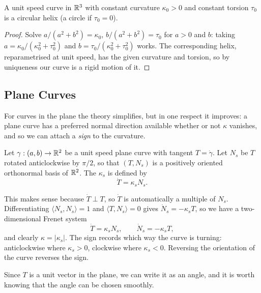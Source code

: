\documentclass[a4paper]{scrartcl}
\begin{document}
\begin{corollary}
    A unit speed curve in $\mathbb{R}^3$ with constant curvature $\kappa_0 > 0$ and constant torsion $\tau_0$ is a circular helix (a circle if $\tau_0 = 0$).
\end{corollary}
\begin{proof}
    Solve $a/(a^2+b^2) = \kappa_0$, $b/(a^2+b^2) = \tau_0$ for $a > 0$ and $b$: taking $a = \kappa_0/(\kappa_0^2+\tau_0^2)$ and $b = \tau_0/(\kappa_0^2+\tau_0^2)$ works. The corresponding helix, reparametrised at unit speed, has the given curvature and torsion, so by uniqueness our curve is a rigid motion of it.
\end{proof}

\subsection{Plane Curves}

For curves in the plane the theory simplifies, but in one respect it improves: a plane curve has a preferred normal direction available whether or not $\kappa$ vanishes, and so we can attach a \emph{sign} to the curvature.

\begin{definition}
    Let $\gamma: (a,b) \rightarrow \mathbb{R}^2$ be a unit speed plane curve with tangent $T = \dot\gamma$. Let $N_s$ be $T$ rotated anticlockwise by $\pi/2$, so that $(T, N_s)$ is a positively oriented orthonormal basis of $\mathbb{R}^2$. The  $\kappa_s$ is defined by
    $$
    \dot T = \kappa_s N_s.
    $$
\end{definition}

This makes sense because $\dot T \perp T$, so $\dot T$ is automatically a multiple of $N_s$. Differentiating $\langle N_s, N_s\rangle = 1$ and $\langle T, N_s \rangle = 0$ gives $\dot N_s = -\kappa_s T$, so we have a two-dimensional Frenet system
$$
\dot T = \kappa_s N_s, \qquad \dot N_s = -\kappa_s T,
$$
and clearly $\kappa = |\kappa_s|$. The sign records which way the curve is turning: anticlockwise where $\kappa_s > 0$, clockwise where $\kappa_s < 0$. Reversing the orientation of the curve reverses the sign.

Since $T$ is a unit vector in the plane, we can write it as an angle, and it is worth knowing that the angle can be chosen smoothly.
\end{document}
